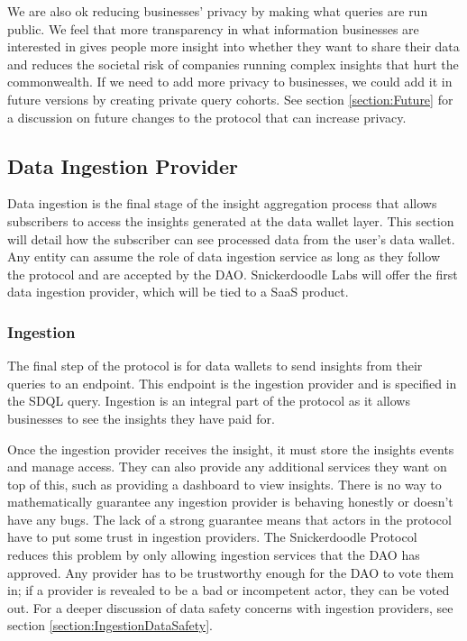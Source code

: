 We are also ok reducing businesses' privacy by making what queries are run public. We feel that more transparency in what information businesses are interested in gives people more insight into whether they want to share their data and reduces the societal risk of companies running complex insights that hurt the commonwealth. If we need to add more privacy to businesses, we could add it in future versions by creating private query cohorts. See section \ref{section:Future} for a discussion on future changes to the protocol that can increase privacy.

\subsection{Data Ingestion Provider} %
Data ingestion is the final stage of the insight aggregation process that allows subscribers to access the insights generated at the data wallet layer. This section will detail how the subscriber can see processed data from the user's data wallet. Any entity can assume the role of data ingestion service as long as they follow the protocol and are accepted by the DAO. Snickerdoodle Labs will offer the first data ingestion provider, which will be tied to a SaaS product. 

\subsubsection{Ingestion}
The final step of the protocol is for data wallets to send insights from their queries to an endpoint. This endpoint is the ingestion provider and is specified in the SDQL query. Ingestion is an integral part of the protocol as it allows businesses to see the insights they have paid for.



Once the ingestion provider receives the insight, it must store the insights events and manage access. They can also provide any additional services they want on top of this, such as providing a dashboard to view insights. There is no way to mathematically guarantee any ingestion provider is behaving honestly or doesn't have any bugs. The lack of a strong guarantee means that actors in the protocol have to put some trust in ingestion providers. The Snickerdoodle Protocol reduces this problem by only allowing ingestion services that the DAO has approved. Any provider has to be trustworthy enough for the DAO to vote them in; if a provider is revealed to be a bad or incompetent actor, they can be voted out. For a deeper discussion of data safety concerns with ingestion providers, see section \ref{section:IngestionDataSafety}.


